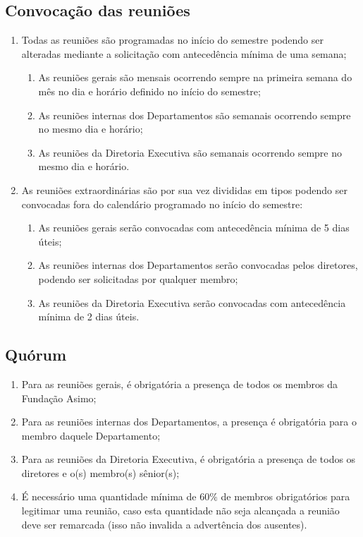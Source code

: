     \subsection{Convocação das reuniões}
    \begin{enumerate}
        \item Todas as reuniões são programadas no início do semestre podendo ser alteradas mediante a solicitação com antecedência mínima de uma semana;
        \begin{enumerate}
            \item As reuniões gerais são mensais ocorrendo sempre na primeira semana do mês no dia e horário definido no início do semestre;
            \item As reuniões internas dos Departamentos são semanais ocorrendo sempre no mesmo dia e horário;
            \item As reuniões da Diretoria Executiva são semanais ocorrendo sempre no mesmo dia e horário.
        \end{enumerate}
        \item As reuniões extraordinárias são por sua vez divididas em tipos podendo ser convocadas fora do calendário programado no início do semestre: 
        \begin{enumerate}
            \item As reuniões gerais serão convocadas com antecedência mínima de 5 dias úteis;
            \item As reuniões internas dos Departamentos serão convocadas pelos diretores, podendo ser solicitadas por qualquer membro;
            \item As reuniões da Diretoria Executiva serão convocadas com antecedência mínima de 2 dias úteis.
        \end{enumerate}
    \end{enumerate}
    \subsection{Quórum}

        \begin{enumerate}
            \item Para as reuniões gerais, é obrigatória a presença de todos os membros da Fundação Asimo;
            \item Para as reuniões internas dos Departamentos, a presença é obrigatória para o membro daquele Departamento;
            \item Para as reuniões da Diretoria Executiva, é obrigatória a presença de todos os diretores e o(s) membro(s) sênior(s);
            \item É necessário uma quantidade mínima de 60$\%$ de membros obrigatórios para legitimar uma reunião, caso esta quantidade não seja alcançada a reunião deve ser remarcada (isso não invalida a advertência dos ausentes).
        \end{enumerate}

